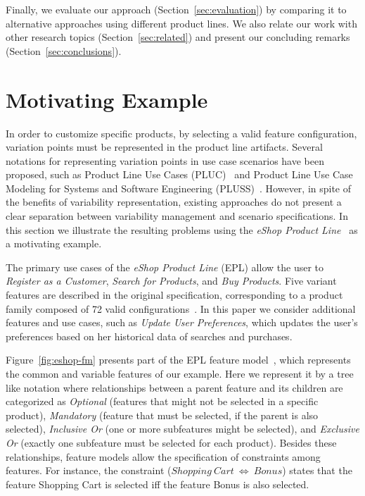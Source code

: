 \documentclass{acm_proc_article-sp}
\begin{document}
Finally, we evaluate our approach (Section~\ref{sec:evaluation}) by comparing it
to alternative approaches using different product lines. We also relate our work
with other research topics (Section~\ref{sec:related}) and present our concluding
remarks (Section~\ref{sec:conclusions}). 
\section{Motivating Example}
\label{sec:problem}

In order to customize specific products, by selecting a valid feature
configuration, variation points must be represented in the product line
artifacts. Several notations for representing variation points in use case
scenarios have been proposed, such as Product Line Use Cases
(PLUC)~\cite{Bertolino:2003aa} and Product Line Use Case Modeling for Systems
and Software Engineering (PLUSS)~\cite{Eriksson:2005aa}. However, in spite of
the benefits of variability representation, existing approaches do not present
a clear separation between variability management and scenario specifications. In this
section we illustrate the resulting problems using the \emph{eShop Product
Line}~\cite{Pohl:eshop} as a motivating example.

The primary use cases of the \emph{eShop Product Line} (EPL) allow the user to
\emph{Register as a Customer}, \emph{Search for Products}, and \emph{Buy
Products}.  Five variant features are described in the original specification,
corresponding to a product family composed of 72 valid
configurations~\cite{Pohl:eshop}. In this paper we consider additional features
and use cases, such as \emph{Update User Preferences}, which updates the user's
preferences based on her historical data of searches and purchases.

Figure~\ref{fig:eshop-fm} presents part of the
EPL feature model~\cite{Gheyi:2006aa,Czarnecki:2000aa}, which represents the
common and variable features of our example. Here we represent it by a tree like
notation where relationships between a parent feature and its children are
categorized as \emph{Optional} (features that might not be selected in a specific product), \emph{Mandatory} (feature that must be selected, if the parent
is also selected), \emph{Inclusive Or} (one or more subfeatures might be selected), and
\emph{Exclusive Or} (exactly one subfeature must be selected for each product).
Besides these relationships, feature models allow the specification of
constraints among features. For instance, the constraint ($Shopping\ Cart\
\Leftrightarrow\ Bonus$) states that the feature Shopping Cart is selected iff
the feature Bonus is also selected.
\end{document}
